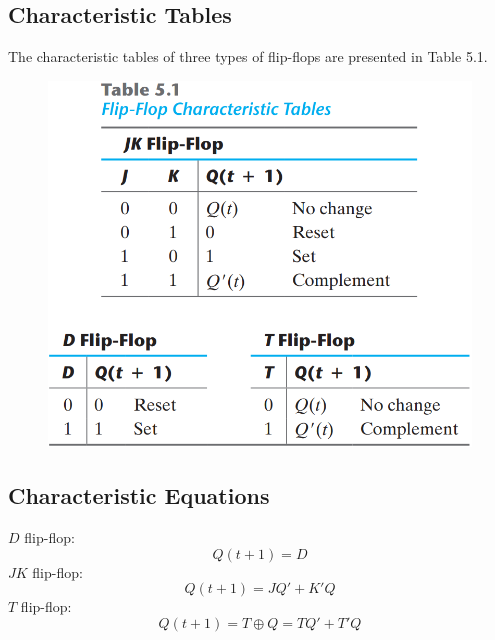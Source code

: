 \subsection{Characteristic Tables}
\label{subsec:char-tables}

The characteristic tables of three types of flip-flops are presented in Table 5.1.
\begin{figure}[H]
  \centering
  \includegraphics[width=\linewidth]{img/table-5.1.png}
  \label{table:5.1}
\end{figure}


\subsection{Characteristic Equations}
\label{subsec:char-equations}

$D$ flip-flop:
\begin{equation*}
  Q(t + 1) = D
\end{equation*}
$JK$ flip-flop:
\begin{equation*}
  Q(t + 1) = JQ' + K'Q
\end{equation*}
$T$ flip-flop:
\begin{equation*}
  Q(t + 1) = T \oplus Q = TQ' + T'Q
\end{equation*}

\setcounter{figure}{14}
